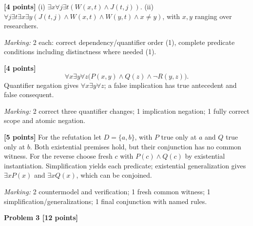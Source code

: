 \documentclass[12pt,letterpaper]{article}
\newcommand{\problemheading}[2][5\baselineskip]{\Needspace{#1}\par\noindent\hspace*{-0.625in}\textbf{#2}\par\nobreak\vspace{0.3em}}
\begin{document}
\begin{description}[font=\normalfont,leftmargin=1.2em,labelsep=0.4em]
\item[(a)] \textbf{[4 points]} (i) $\exists x\forall j\exists t(W(x,t)\land J(t,j))$. (ii) $\forall j\exists t\exists x\exists y(J(t,j)\land W(x,t)\land W(y,t)\land x\ne y)$, with $x,y$ ranging over researchers.
\par\textit{Marking:} 2 each: correct dependency/quantifier order (1), complete predicate conditions including distinctness where needed (1).
\item[(b)] \textbf{[4 points]} \[\forall x\exists y\forall z\bigl(P(x,y)\land Q(z)\land\neg R(y,z)\bigr).\] Quantifier negation gives $\forall x\exists y\forall z$; a false implication has true antecedent and false consequent.
\par\textit{Marking:} 2 correct three quantifier changes; 1 implication negation; 1 fully correct scope and atomic negation.
\item[(c)] \textbf{[5 points]} For the refutation let $D=\{a,b\}$, with $P$ true only at $a$ and $Q$ true only at $b$. Both existential premises hold, but their conjunction has no common witness. For the reverse choose fresh $c$ with $P(c)\land Q(c)$ by existential instantiation. Simplification yields each predicate; existential generalization gives $\exists xP(x)$ and $\exists xQ(x)$, which can be conjoined.
\par\textit{Marking:} 2 countermodel and verification; 1 fresh common witness; 1 simplification/generalizations; 1 final conjunction with named rules.
\end{description}
\vspace{0.65em}
\problemheading[\dimexpr 3\baselineskip+4\baselineskip\relax]{Problem 3 [12 points]}
\end{document}
